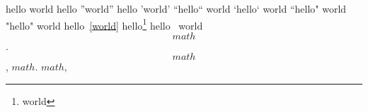 
hello world              %
hello ''world''          %
hello 'world'            %
``hello`` world          %
`hello` world            %
``hello" world           %
"hello" world            %
hello~\ref{world}        %
hello\footnote{world}   %
hello~ world             %
\[math\].                %
\[math\],                %
$math.$                  %
$math,$                  %

